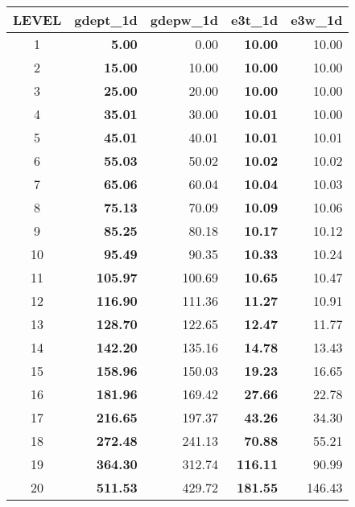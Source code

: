 \documentclass[../main/NEMO_manual]{subfiles}
\begin{document}
\begin{table}
  \begin{center}
    \begin{tabular}{c||r|r|r|r}
      \hline
      \textbf{LEVEL}& \textbf{gdept\_1d}& \textbf{gdepw\_1d}& \textbf{e3t\_1d }& \textbf{e3w\_1d  } \\ \hline
      1	&	\textbf{  5.00}	&       0.00 &	\textbf{ 10.00} &	 10.00 \\	\hline
      2	&	\textbf{15.00}	& 	  10.00 &	\textbf{ 10.00} &	 10.00 \\	\hline
      3	&	\textbf{25.00}	&	  20.00 &	\textbf{ 10.00} & 	 10.00 \\	\hline
      4	&	\textbf{35.01}	&	  30.00 & 	\textbf{ 10.01} & 	 10.00 \\	\hline
      5	&	\textbf{45.01}	&	  40.01 &	\textbf{ 10.01} &	 10.01 \\	\hline
      6	&	\textbf{55.03}	&	  50.02 &	\textbf{ 10.02} & 	 10.02 \\	\hline
      7	&	\textbf{65.06}	&	  60.04 &	\textbf{ 10.04} &	 10.03 \\	\hline
      8	&	\textbf{75.13}	&	  70.09 &	\textbf{ 10.09} &	 10.06 \\	\hline
      9	&	\textbf{85.25}	&	  80.18 &	\textbf{ 10.17} &	 10.12 \\	\hline
      10	& 	\textbf{95.49}	& 	  90.35 &	\textbf{ 10.33} &	 10.24 \\	\hline
      11	& 	\textbf{105.97}	& 	 100.69 &	\textbf{ 10.65} &	 10.47 \\	\hline
      12	& 	\textbf{116.90}	& 	 111.36 &	\textbf{ 11.27} &	 10.91 \\	\hline
      13	& 	\textbf{128.70}	& 	 122.65 &	\textbf{ 12.47} &	 11.77 \\	\hline
      14	& 	\textbf{142.20}	& 	 135.16 &	\textbf{ 14.78} &	 13.43 \\	\hline
      15	& 	\textbf{158.96}	& 	 150.03 &	\textbf{ 19.23} &	 16.65 \\	\hline
      16	& 	\textbf{181.96}	& 	 169.42 &	\textbf{ 27.66} &	 22.78 \\	\hline
      17	& 	\textbf{216.65}	& 	 197.37 & 	\textbf{ 43.26} &	 34.30 \\ \hline
      18	& 	\textbf{272.48}	& 	 241.13 & 	\textbf{ 70.88} &	 55.21 \\ \hline
      19	& 	\textbf{364.30}	& 	 312.74 & 	\textbf{116.11} &	 90.99 \\ \hline
      20	& 	\textbf{511.53}	& 	 429.72 & 	\textbf{181.55} & 	146.43 \\ \hline

\end{tabular}
\end{center}
\end{table}
\end{document}
